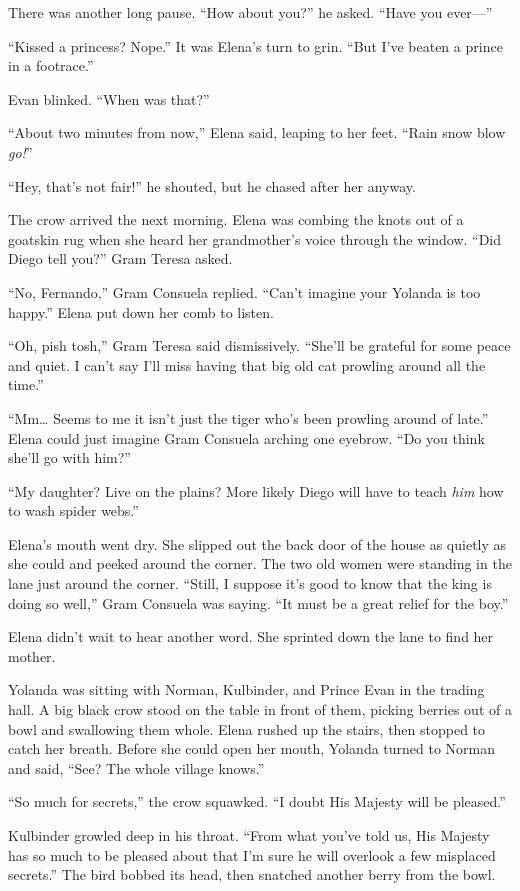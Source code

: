 \documentclass[10pt]{book}
\begin{document}
There was another long pause. ``How about you?'' he asked. ``Have you ever---''

``Kissed a princess? Nope.'' It was Elena's turn to grin. ``But I've beaten a prince in a footrace.''

Evan blinked. ``When was that?''

``About two minutes from now,'' Elena said, leaping to her feet. ``Rain snow blow \emph{go!}''

``Hey, that's not fair!'' he shouted, but he chased after her anyway.

The crow arrived the next morning. Elena was combing the knots out of a goatskin rug when she heard her grandmother's voice through the window. ``Did Diego tell you?'' Gram Teresa asked.

``No, Fernando,'' Gram Consuela replied. ``Can't imagine your Yolanda is too happy.'' Elena put down her comb to listen.

``Oh, pish tosh,'' Gram Teresa said dismissively. ``She'll be grateful for some peace and quiet. I can't say I'll miss having that big old cat prowling around all the time.''

``Mm{\ldots} Seems to me it isn't just the tiger who's been prowling around of late.'' Elena could just imagine Gram Consuela arching one eyebrow. ``Do you think she'll go with him?''

``My daughter? Live on the plains? More likely Diego will have to teach \emph{him} how to wash spider webs.''

Elena's mouth went dry. She slipped out the back door of the house as quietly as she could and peeked around the corner. The two old women were standing in the lane just around the corner. ``Still, I suppose it's good to know that the king is doing so well,'' Gram Consuela was saying. ``It must be a great relief for the boy.''

Elena didn't wait to hear another word. She sprinted down the lane to find her mother.

Yolanda was sitting with Norman, Kulbinder, and Prince Evan in the trading hall. A big black crow stood on the table in front of them, picking berries out of a bowl and swallowing them whole. Elena rushed up the stairs, then stopped to catch her breath. Before she could open her mouth, Yolanda turned to Norman and said, ``See? The whole village knows.''

``So much for secrets,'' the crow squawked. ``I doubt His Majesty will be pleased.''

Kulbinder growled deep in his throat. ``From what you've told us, His Majesty has so much to be pleased about that I'm sure he will overlook a few misplaced secrets.'' The bird bobbed its head, then snatched another berry from the bowl.
\end{document}
